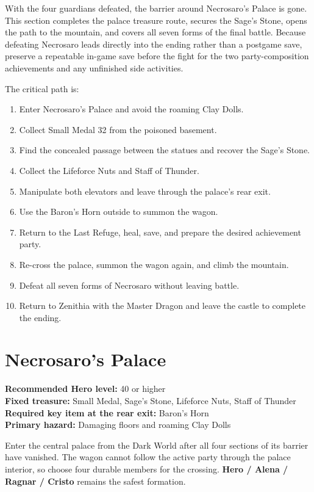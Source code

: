 \documentclass[
  american,
  10pt,
  letterpaper,
  oneside,
  open=any]{scrreprt}
\providecommand{\tightlist}{%
  \setlength{\itemsep}{0pt}\setlength{\parskip}{0pt}}
\begin{document}
With the four guardians defeated, the barrier around Necrosaro's Palace
is gone. This section completes the palace treasure route, secures the
Sage's Stone, opens the path to the mountain, and covers all seven forms
of the final battle. Because defeating Necrosaro leads directly into the
ending rather than a postgame save, preserve a repeatable in-game save
before the fight for the two party-composition achievements and any
unfinished side activities.

The critical path is:

\begin{enumerate}
\def\labelenumi{\arabic{enumi}.}
\tightlist
\item
  Enter Necrosaro's Palace and avoid the roaming Clay Dolls.
\item
  Collect Small Medal 32 from the poisoned basement.
\item
  Find the concealed passage between the statues and recover the Sage's
  Stone.
\item
  Collect the Lifeforce Nuts and Staff of Thunder.
\item
  Manipulate both elevators and leave through the palace's rear exit.
\item
  Use the Baron's Horn outside to summon the wagon.
\item
  Return to the Last Refuge, heal, save, and prepare the desired
  achievement party.
\item
  Re-cross the palace, summon the wagon again, and climb the mountain.
\item
  Defeat all seven forms of Necrosaro without leaving battle.
\item
  Return to Zenithia with the Master Dragon and leave the castle to
  complete the ending.
\end{enumerate}

\section{Necrosaro's Palace}\label{necrosaros-palace}

\textbf{Recommended Hero level:} 40 or higher\\
\textbf{Fixed treasure:} Small Medal, Sage's Stone, Lifeforce Nuts,
Staff of Thunder\\
\textbf{Required key item at the rear exit:} Baron's Horn\\
\textbf{Primary hazard:} Damaging floors and roaming Clay Dolls

Enter the central palace from the Dark World after all four sections of
its barrier have vanished. The wagon cannot follow the active party
through the palace interior, so choose four durable members for the
crossing. \textbf{Hero / Alena / Ragnar / Cristo} remains the safest
formation.
\end{document}
